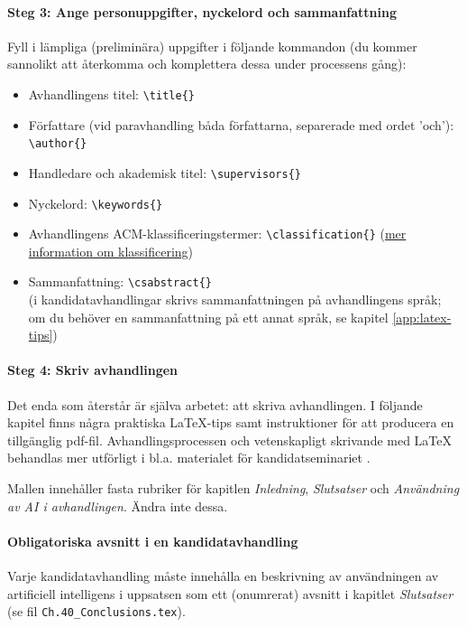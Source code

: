 \documentclass[swedish, manual, a4paper]{csthesis}
\begin{document}
\paragraph{Steg 3: Ange personuppgifter, nyckelord och sammanfattning}
Fyll i lämpliga (preliminära) uppgifter i följande kommandon (du kommer sannolikt att återkomma och komplettera dessa under processens gång):
\begin{itemize}
\item Avhandlingens titel: \texttt{\textbackslash title\{\}}
\item Författare (vid paravhandling båda författarna, separerade med ordet ’och’):\\ \texttt{\textbackslash author\{\}}
\item Handledare och akademisk titel: \texttt{\textbackslash supervisors\{\}}
\item Nyckelord: \texttt{\textbackslash keywords\{\}}
\item Avhandlingens ACM-klassificeringstermer: \texttt{\textbackslash classification\{\}} (\href{https://dl.acm.org/ccs}{mer information om klassificering})
\item Sammanfattning: \texttt{\textbackslash csabstract\{\}} \\(i kandidatavhandlingar skrivs sammanfattningen på avhandlingens språk; om du behöver en sammanfattning på ett annat språk, se kapitel \ref{app:latex-tips})
\end{itemize}

\paragraph{Steg 4: Skriv avhandlingen}
Det enda som återstår är själva arbetet: att skriva avhandlingen.  
I följande kapitel finns några praktiska \LaTeX-tips samt instruktioner för att producera en tillgänglig pdf-fil. Avhandlingsprocessen och vetenskapligt skrivande med \LaTeX{} behandlas mer utförligt i bl.a. materialet för kandidatseminariet \parencite{tieteellinenkirjoittaminen}.

Mallen innehåller fasta rubriker för kapitlen \textit{Inledning}, \textit{Slutsatser} och \textit{Användning av AI i avhandlingen}. Ändra inte dessa. 

\paragraph{Obligatoriska avsnitt i en kandidatavhandling}
Varje kandidatavhandling måste innehålla en beskrivning av användningen av artificiell intelligens i uppsatsen som ett (onumrerat) avsnitt i kapitlet {\em Slutsatser}
(se fil \texttt{Ch.40\_Conclusions.tex}).
\end{document}
